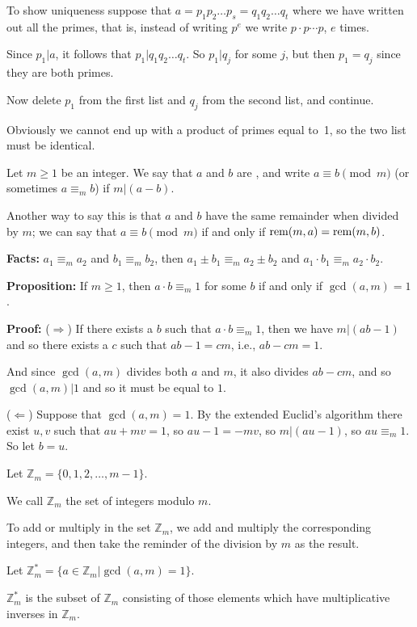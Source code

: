\begin{frame}

To show uniqueness suppose that $a=p_1p_2\ldots p_s=q_1q_2\ldots q_t$
where we have written out all the primes, that is, instead of writing
$p^e$ we write $p\cdot p\cdots p$, $e$ times.  

Since $p_1|a$, it
follows that
$p_1|q_1q_2\ldots q_t$.  So $p_1|q_j$ for some $j$,
but then $p_1=q_j$ since they are both primes.

Now delete $p_1$ from the first list and $q_j$ from the second list,
and continue.  

Obviously we cannot end up with a product of primes
equal to~1, so the two list must be identical. 
\end{frame}

\begin{frame}

Let $m\ge 1$ be an integer.  We say that $a$ and $b$ are 
, and
write $a\equiv b\pmod m$ (or sometimes
$a\equiv_mb$) if $m|(a-b)$.  


Another way to say this is that $a$ and
$b$ have the same remainder when divided by $m$;
we can say that $a\equiv
b\pmod m$ if and only if $\mathrm{rem}(m,a)=\mathrm{rem}(m,b)$.

{\bf Facts:} $a_1\equiv_ma_2$ and $b_1\equiv_mb_2$, then $a_1\pm
b_1\equiv_m a_2\pm b_2$ and $a_1\cdot b_1\equiv_m a_2\cdot b_2$.

\end{frame}

\begin{frame}

{\bf Proposition:}
If $m\ge 1$, then $a\cdot b\equiv_m1$ for some $b$ if and only if
$\gcd(a,m)=1$.

{\bf Proof:}
($\Rightarrow$) If there exists a $b$ such that $a\cdot b\equiv_m1$,
then we have $m|(ab-1)$ and so there exists a $c$ such that $ab-1=cm$,
i.e., $ab-cm=1$.  

And since $\gcd(a,m)$ divides both $a$ and $m$, it
also divides $ab-cm$, and so $\gcd(a,m)|1$ and so it must be equal to
$1$.

($\Leftarrow$)  Suppose that $\gcd(a,m)=1$.  By the extended
Euclid's algorithm
there exist $u,v$ such that $au+mv=1$,
so
$au-1=-mv$, so $m|(au-1)$, so
$au\equiv_m1$.  So let $b=u$.

\end{frame}

\begin{frame}

Let $\mathbb{Z}_m=\{0,1,2,\ldots,m-1\}$.  

We call $\mathbb{Z}_m$ the
set of integers modulo $m$.  

To add or multiply in the set
$\mathbb{Z}_m$, we add and multiply the corresponding integers, and
then take the reminder of the division by $m$ as the result.  

Let
$\mathbb{Z}_m^*=\{a\in\mathbb{Z}_m|\gcd(a,m)=1\}$. 

$\mathbb{Z}_m^*$ is the subset
of $\mathbb{Z}_m$ consisting of those elements which have
multiplicative inverses in $\mathbb{Z}_m$.

\end{frame}

